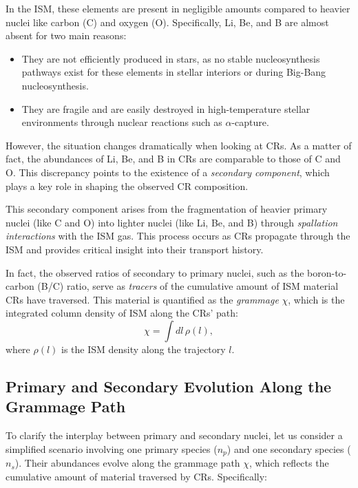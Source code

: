 In the ISM, these elements are present in negligible amounts compared to heavier nuclei like carbon (C) and oxygen (O). Specifically, Li, Be, and B are almost absent for two main reasons:  
\begin{itemize}
\item They are not efficiently produced in stars, as no stable nucleosynthesis pathways exist for these elements in stellar interiors or during Big-Bang nucleosynthesis.  
\item They are fragile and are easily destroyed in high-temperature stellar environments through nuclear reactions such as \(\alpha\)-capture.  
\end{itemize}

However, the situation changes dramatically when looking at CRs. As a matter of fact, the abundances of Li, Be, and B in CRs are comparable to those of C and O. This discrepancy points to the existence of a \emph{secondary component}, which plays a key role in shaping the observed CR composition.  

This secondary component arises from the fragmentation of heavier primary nuclei (like C and O) into lighter nuclei (like Li, Be, and B) through \emph{spallation interactions} with the ISM gas. This process occurs as CRs propagate through the ISM and provides critical insight into their transport history.  

In fact, the observed ratios of secondary to primary nuclei, such as the boron-to-carbon (B/C) ratio, serve as \emph{tracers} of the cumulative amount of ISM material CRs have traversed. This material is quantified as the \emph{grammage} \(\chi\), which is the integrated column density of ISM along the CRs’ path:  
\begin{equation}
\chi = \int \! dl \, \rho(l),
\end{equation}
where \(\rho(l)\) is the ISM density along the trajectory \(l\).  

\subsection{Primary and Secondary Evolution Along the Grammage Path}

To clarify the interplay between primary and secondary nuclei, let us consider a simplified scenario involving one primary species (\(n_p\)) and one secondary species (\(n_s\)). Their abundances evolve along the grammage path \(\chi\), which reflects the cumulative amount of material traversed by CRs. Specifically:  

